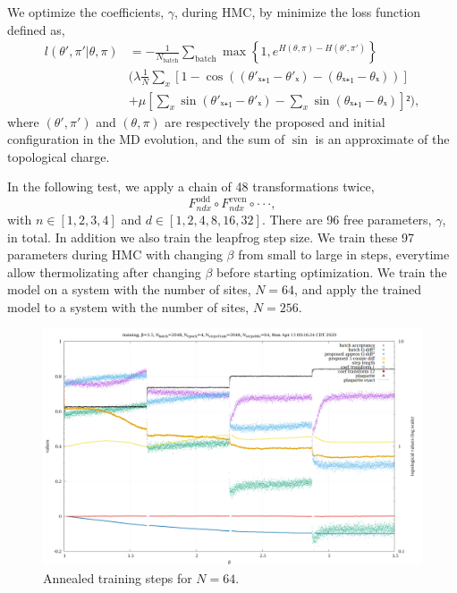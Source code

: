 We optimize the coefficients, $γ$, during HMC,
by minimize the loss function defined as,
\begin{equation}
\begin{split}
	l(θ',π'|θ,π) &= - \frac{1}{N_{\text{batch}}} \sum_{\text{batch}}
	\max\left\{1, e^{H(θ,π)-H(θ',π')}\right\} \\
	&\Bigg(
		λ \frac{1}{N} \sum_x \left[ 1-\cos\left((θ'ₓ₊₁-θ'ₓ)-(θₓ₊₁-θₓ)\right) \right] \\
		&+ μ \left[ \sum_x \sin(θ'ₓ₊₁-θ'ₓ)-\sum_x \sin(θₓ₊₁-θₓ) \right]²
	\Bigg),
\end{split}
\end{equation}
where $(θ',π')$ and $(θ,π)$ are respectively the proposed and initial configuration
in the MD evolution,
and the sum of $\sin$ is an approximate of the topological charge.

In the following test, we apply a chain of 48 transformations twice,
\begin{equation}
	F_{ndx}^{\text{odd}} \circ F_{ndx}^{\text{even}} \circ \cdot\cdot\cdot,
\end{equation}
with $n∈[1,2,3,4]$ and $d∈[1,2,4,8,16,32]$.
There are 96 free parameters, $γ$, in total.
In addition we also train the leapfrog step size.
We train these 97 parameters during HMC with changing $β$
from small to large in steps,
everytime allow thermolizating after changing $β$ before starting optimization.
We train the model on a system with the number of sites, $N=64$,
and apply the trained model to a system with the number of sites, $N=256$.

\begin{figure}
	\centering
	\includegraphics[width=\textwidth]{../t13.png}
	\caption{\label{training}Annealed training steps for $N=64$.}
\end{figure}

